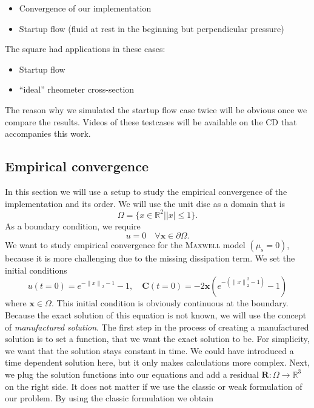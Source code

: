 \documentclass[12pt,a4paper,twoside, open=right]{scrreprt}
\theoremstyle{definition}
\theoremstyle{plain}
\newcommand{\abs}[1]{\left\vert #1\right\vert}
\newcommand{\rr}{\mathbb{R}}
\newcommand{\norm}[1]{\left\lVert#1\right\rVert}
\newcommand{\bfC}{\bm{C}}
\newcommand{\bfx}{\bm{x}}
\newcommand{\bfR}{\bm{R}}
\begin{document}
\begin{itemize}
    \item Convergence of our implementation
    \item Startup flow (fluid at rest in the beginning but perpendicular pressure)
\end{itemize}
The square had applications in these cases:
\begin{itemize}
    \item Startup flow
    \item \enquote{ideal} rheometer cross-section
\end{itemize}
The reason why we simulated the startup flow case twice will be obvious once we compare the results. Videos of these testcases will be available on the CD that accompanies this work.
\subsection{Empirical convergence}
In this section we will use a setup to study the empirical convergence of the implementation and its order. We will use the unit disc as a domain that is
\begin{equation}
    \Omega =\{x\in\rr^2|\abs{x}\le 1\}.
\end{equation} 
As a boundary condition, we require
\begin{equation}
u = 0\quad\forall\bfx\in\partial\Omega.
\end{equation}
We want to study empirical convergence for the \textsc{Maxwell} model $(\mu_s=0)$, because it is more challenging due to the missing dissipation term.
We set the initial conditions
\begin{equation}
u(t=0) = e^{-\norm{x}_2-1}-1,
\quad\bfC(t=0) = -2\bfx(e^{-(\norm{x}_2^2 -1)}-1)
\end{equation}
where $\bfx\in\Omega$. This initial condition is obviously continuous at the boundary. Because the exact solution of this equation is not known, we will use the concept of \emph{manufactured solution}. The first step in the process of creating a manufactured solution is to set a function, that we want the exact solution to be. For simplicity, we want that the solution stays constant in time.  We could have introduced a time dependent solution here, but it only makes calculations more complex. Next, we plug the solution functions into our equations and add a residual $\bfR\colon\Omega\to\rr^3$ on the right side. It does not matter if we use the classic or weak formulation of our problem. By using the classic formulation we obtain
\end{document}
